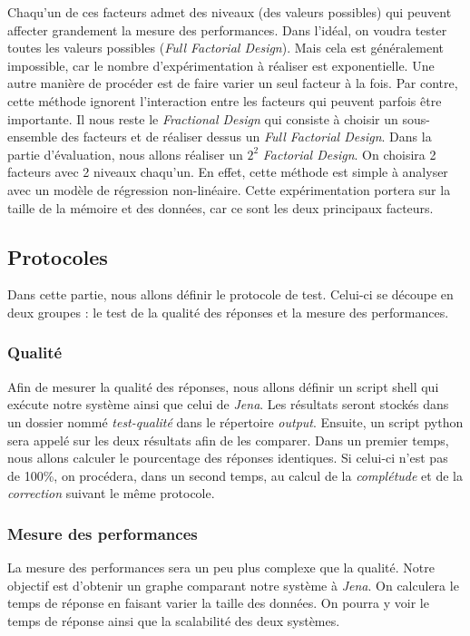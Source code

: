 \documentclass[12pt,titlepage]{article}
\begin{document}
Chaqu'un de ces facteurs admet des niveaux (des valeurs possibles) qui peuvent affecter grandement la mesure des performances. Dans l'idéal, on voudra tester toutes les valeurs possibles (\textit{Full Factorial Design}). Mais cela est généralement impossible, car le nombre d'expérimentation à réaliser est exponentielle. Une autre manière de procéder est de faire varier un seul facteur à la fois. Par contre, cette méthode ignorent l'interaction entre les facteurs qui peuvent parfois être importante. Il nous reste le \textit{Fractional Design} qui consiste à choisir un sous-ensemble des facteurs et de réaliser dessus un \textit{Full Factorial Design}. Dans la partie d'évaluation, nous allons réaliser un $2^2$ \textit{Factorial Design}. On choisira 2 facteurs avec 2 niveaux chaqu'un. En effet, cette méthode est simple à analyser avec un modèle de régression non-linéaire. Cette expérimentation portera sur la taille de la mémoire et des données, car ce sont les deux principaux facteurs.

\subsection{Protocoles}

Dans cette partie, nous allons définir le protocole de test. Celui-ci se découpe en deux groupes : le test de la qualité des réponses et la mesure des performances.

\subsubsection{Qualité}

Afin de mesurer la qualité des réponses, nous allons définir un script shell qui exécute notre système ainsi que celui de \textit{Jena}. Les résultats seront stockés dans un dossier nommé \textit{test-qualité} dans le répertoire \textit{output}. Ensuite, un script python sera appelé sur les deux résultats afin de les comparer. Dans un premier temps, nous allons calculer le pourcentage des réponses identiques. Si celui-ci n'est pas de 100\%, on procédera, dans un second temps, au calcul de la \textit{complétude} et de la \textit{correction} suivant le même protocole.

\subsubsection{Mesure des performances}

La mesure des performances sera un peu plus complexe que la qualité. Notre objectif est d'obtenir un graphe comparant notre système à \textit{Jena}. On calculera le temps de réponse en faisant varier la taille des données. On pourra y voir le temps de réponse ainsi que la scalabilité des deux systèmes.
\end{document}

